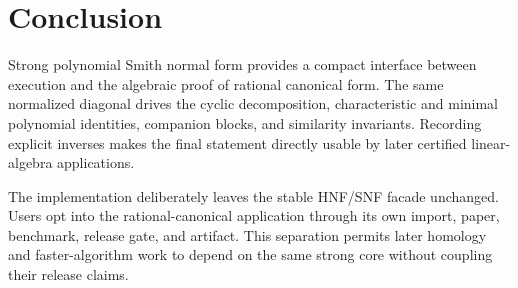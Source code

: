\section{Conclusion}

Strong polynomial Smith normal form provides a compact interface between
execution and the algebraic proof of rational canonical form.  The same
normalized diagonal drives the cyclic decomposition, characteristic and
minimal polynomial identities, companion blocks, and similarity invariants.
Recording explicit inverses makes the final statement directly usable by
later certified linear-algebra applications.

The implementation deliberately leaves the stable HNF/SNF facade unchanged.
Users opt into the rational-canonical application through its own import,
paper, benchmark, release gate, and artifact.  This separation permits later
homology and faster-algorithm work to depend on the same strong core without
coupling their release claims.
